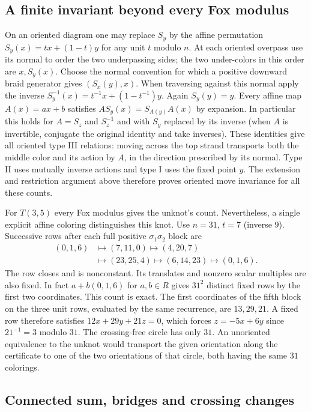 \subsection{A finite invariant beyond every Fox modulus}

On an oriented diagram one may replace $S_y$ by the affine permutation
$S_y(x)=t x+(1-t)y$ for any unit $t$ modulo $n$. At each oriented overpass
use its normal to order the two underpassing sides; the two under-colors
in this order are $x,S_y(x)$. Choose the normal convention for which a
positive downward braid generator gives $(S_x(y),x)$. When traversing
against this normal apply the inverse $S_y^{-1}(x)=t^{-1}x+(1-t^{-1})y$.
Again $S_y(y)=y$. Every affine map $A(x)=ax+b$ satisfies
$A S_y(x)=S_{A(y)} A(x)$ by expansion. In particular this holds for
$A=S_z$ and $S_z^{-1}$ and with $S_y$ replaced by its inverse (when $A$
is invertible, conjugate the original identity and take inverses).
These identities give all oriented type III relations: moving across
the top strand transports both the middle color and its action by
$A$, in the direction prescribed by its normal. Type II uses mutually
inverse actions and type I uses the fixed point $y$. The extension and
restriction argument above therefore proves oriented move invariance for
all these counts.

For $T(3,5)$ every Fox modulus gives the unknot's count. Nevertheless, a
single explicit affine coloring distinguishes this knot. Use $n=31$,
$t=7$ (inverse $9$). Successive rows after each full positive
$\sigma_1\sigma_2$ block are
\[
\begin{aligned}
(0,1,6)&\longmapsto(7,11,0)\longmapsto(4,20,7)\\
 &\longmapsto(23,25,4)\longmapsto(6,14,23)\longmapsto(0,1,6).
\end{aligned}
\]
The row closes and is nonconstant. Its translates and nonzero scalar
multiples are also fixed. In fact $a+b(0,1,6)$ for $a,b\in R$ gives
$31^2$ distinct fixed rows by the first two coordinates. This count is exact.
The first coordinates of the fifth block on the three unit rows, evaluated
by the same recurrence, are $13,29,21$. A fixed row therefore satisfies
$12x+29y+21z=0$, which forces $z=-5x+6y$ since $21^{-1}=3$ modulo $31$.
The crossing-free circle has only $31$. An unoriented equivalence to the unknot would
transport the given orientation along the certificate to one of the
two orientations of that circle, both having the same $31$ colorings.

\subsection{Connected sum, bridges and crossing changes}

